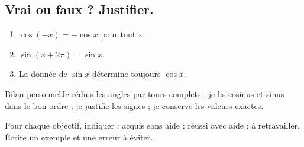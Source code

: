 \subsection*{Vrai ou faux ? Justifier.}\label{C10-VF}
\begin{enumerate}
\item $\cos(-x)=-\cos x$ pour tout x.
\item $\sin(x+2\pi)=\sin x$.
\item La donnée de $\sin x$ détermine toujours $\cos x$.
\end{enumerate}
\begin{repere}{Bilan personnel}Je réduis les angles par tours complets ; je lis cosinus et sinus dans le bon ordre ; je justifie les signes ; je conserve les valeurs exactes.

Pour chaque objectif, indiquer : acquis sans aide ; réussi avec aide ; à retravailler. Écrire un exemple et une erreur à éviter.\end{repere}
\endgroup
\ifprof\fi
